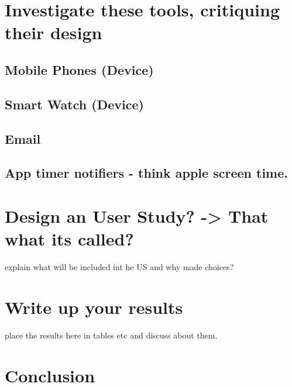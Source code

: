 \documentclass{sigchi}
\begin{document}
\section{Investigate these tools, critiquing their design}
		\subsection{Mobile Phones (Device)}
		\subsection{Smart Watch (Device)}
		\subsection{Email}
		\subsection{App timer notifiers - think apple screen time.}
	
	



\section{Design an User Study? -> That what its called?}
	explain what will be included int he US and why made choices?


	


\section{Write up your results}
	place the results here in tables etc and discuss about them.

\section{Conclusion}
	 
	
	
\balance{}



\end{document}
